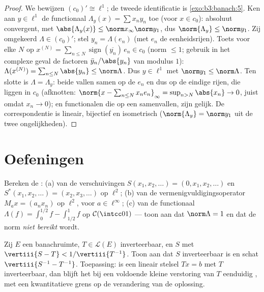 \begin{proof}
We bewijzen $(c_0)' \cong \ell^1$; de tweede identificatie is
\cref{exo:b3:banach:5}. Ken aan $y \in \ell^1$ de functionaal
$\Lambda_y(x) = \sum x_ny_n$ toe (voor $x \in c_0$): absoluut
convergent, met $\abs{\Lambda_y(x)} \leq \norm x_\infty\norm
y_1$, dus $\norm{\Lambda_y} \leq \norm y_1$. Zij omgekeerd
$\Lambda \in (c_0)'$; stel $y_n = \Lambda(e_n)$ (met $e_n$ de
eenheidsrijen). Toets voor elke $N$ op $x^{(N)} = \sum_{n \leq N}
\operatorname{sign}(\overline{y_n})\,e_n \in c_0$ (norm $\leq 1$;
gebruik in het complexe geval de factoren $\bar y_n/\abs{y_n}$ van
modulus $1$): $\Lambda(x^{(N)}) = \sum_{n\leq N}\abs{y_n} \leq
\norm\Lambda$. Dus $y \in \ell^1$ met $\norm y_1 \leq
\norm\Lambda$. Ten slotte is $\Lambda = \Lambda_y$: beide vallen
samen op de $e_n$ en dus op de eindige rijen, die  liggen in
$c_0$ (afknotten: $\norm{x - \sum_{n \leq N}x_ne_n}_\infty =
\sup_{n > N}\abs{x_n} \to 0$, juist omdat $x_n \to 0$); en
 functionalen die op een  samenvallen,
zijn gelijk. De correspondentie is lineair, bijectief en
isometrisch ($\norm{\Lambda_y} = \norm y_1$ uit de twee
ongelijkheden).
\end{proof}

\section{Oefeningen}

\begin{exercise}[$\star$]\label{exo:b3:banach:1}
Bereken de :
(a) van de verschuivingen $S(x_1, x_2, \dots) = (0, x_1, x_2,
\dots)$ en $S^*(x_1, x_2, \dots) = (x_2, x_3, \dots)$ op
$\ell^2$;
(b) van de vermenigvuldigingsoperator $M_a x = (a_nx_n)$ op
$\ell^2$, voor $a \in \ell^\infty$;
(c) van de functionaal $\Lambda(f) = \int_0^{1/2}f -
\int_{1/2}^1f$ op $\mathcal C(\intcc01)$ --- toon aan dat
$\norm\Lambda = 1$ en dat de norm \emph{niet bereikt} wordt.
\end{exercise}

\begin{exercise}[$\star$]\label{exo:b3:banach:2}
Zij $E$ een banachruimte, $T \in \mathcal L(E)$ inverteerbaar, en
$S$ met $\vertiii{S - T} < 1/\vertiii{T^{-1}}$. Toon aan dat $S$
inverteerbaar is en schat $\vertiii{S^{-1} - T^{-1}}$.
Toepassing: is een lineair stelsel $Tx = b$  met $T$
inverteerbaar, dan blijft het bij een voldoende kleine verstoring
van $T$ eenduidig , met een kwantitatieve grens op de
verandering van de oplossing.
\end{exercise}


